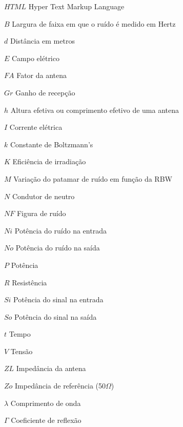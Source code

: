 
\begin{simbolos} \itemsep -1pt
	\item[$ HTML $] Hyper Text Markup Language
	\item[$ B $] Largura de faixa em que o ruído é medido em Hertz
	\item[$ d $] Distância em metros
	\item[$ E $] Campo elétrico
	\item[$ FA $] Fator da antena
	\item[$ Gr $] Ganho de recepção
	\item[$ h $] Altura efetiva ou comprimento efetivo de uma antena
	\item[$ I $] Corrente elétrica
	\item[$ k $] Constante de Boltzmann’s
	\item[$ K $] Eficiência de irradiação
	\item[$ M $] Variação do patamar de ruído em função da RBW
	\item[$ N $] Condutor de neutro
	\item[$ NF $] Figura de ruído
	\item[$ Ni $] Potência do ruído na entrada
	\item[$ No $] Potência do ruído na saída
	\item[$ P $] Potência
	\item[$ R $] Resistência
	\item[$ Si $] Potência do sinal na entrada
	\item[$ So $] Potência do sinal na saída
	\item[$ t $] Tempo
	\item[$ V $] Tensão
	\item[$ ZL  $] Impedância da antena
	\item[$ Zo $] Impedância de referência (50$\Omega$)
	\item[$ \lambda $] Comprimento de onda 
	\item[$ \Gamma $] Coeficiente de reflexão	
\end{simbolos}